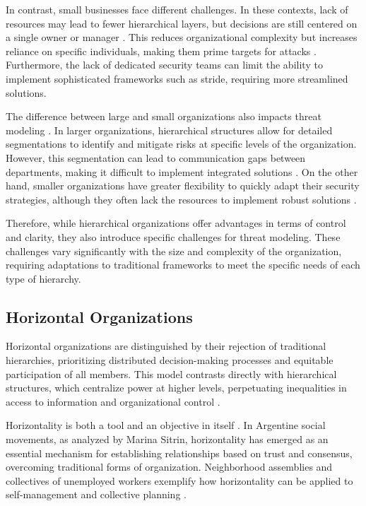 In contrast, small businesses face different challenges. In these contexts, lack
of resources may lead to fewer hierarchical layers, but decisions are still
centered on a single owner or manager \cite{WorkerCooperativesandRevolution}.
This reduces organizational complexity but increases reliance on specific
individuals, making them prime targets for attacks
\cite{WorkerCooperativesinAmerica}. Furthermore, the lack of dedicated security
teams can limit the ability to implement sophisticated frameworks such as
\gls{stride}, requiring more streamlined solutions.

The difference between large and small organizations also impacts threat
modeling \cite{WorkerCooperativesinAmerica,
ThreatModelingASummaryOfAvailableMethods}. In larger organizations, hierarchical
structures allow for detailed segmentations to identify and mitigate risks at
specific levels of the organization. However, this segmentation can lead to
communication gaps between departments, making it difficult to implement
integrated solutions \cite{ThreatModelingASystematicLiteratureReview}. On the
other hand, smaller organizations have greater flexibility to quickly adapt
their security strategies, although they often lack the resources to implement
robust solutions \cite{WorkerCooperativesandRevolution}.

Therefore, while hierarchical organizations offer advantages in terms of control
and clarity, they also introduce specific challenges for threat modeling. These
challenges vary significantly with the size and complexity of the organization,
requiring adaptations to traditional frameworks to meet the specific needs of
each type of hierarchy.

\subsection{Horizontal Organizations}
\label{subsec:horizontal_organizations}

Horizontal organizations are distinguished by their rejection of traditional
hierarchies, prioritizing distributed decision-making processes and equitable
participation of all members. This model contrasts directly with hierarchical
structures, which centralize power at higher levels, perpetuating inequalities
in access to information and organizational control \cite{Non-HierarchicalForms,
EstatutosDoPCP}.

Horizontality is both a tool and an objective in itself \cite{Colbac}. In
Argentine social movements, as analyzed by Marina Sitrin, horizontality has
emerged as an essential mechanism for establishing relationships based on trust
and consensus, overcoming traditional forms of organization. Neighborhood
assemblies and collectives of unemployed workers exemplify how horizontality can
be applied to self-management and collective planning
\cite{EverydayRevolutions}.

